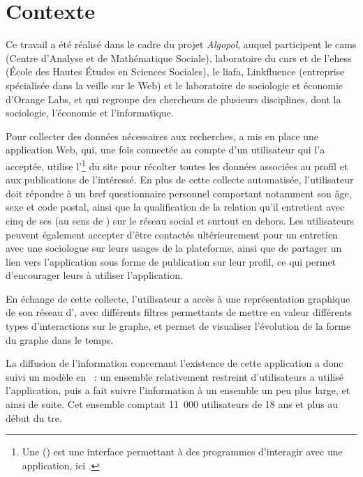 
\section{Contexte}

Ce travail a été réalisé dans le cadre du projet \emph{Algopol}, auquel
participent le {\sc cams} (Centre d’Analyse et de Mathématique Sociale),
laboratoire du {\sc cnrs} et de l'{\sc ehess} (École des Hautes Études en
Sciences Sociales), le {\sc liafa}, Linkfluence (entreprise spécialisée dans la
veille sur le Web) et le laboratoire de sociologie et économie d’Orange Labs,
et qui regroupe des chercheurs de plusieurs disciplines, dont la sociologie,
l’économie et l’informatique.

Pour collecter des données nécessaires aux recherches,  a mis en
place une application Web, qui, une fois connectée au compte \fb{} d’un
utilisateur qui l’a acceptée, utilise l’\api\footnote{Une \api{}
() est une interface permettant à des
programmes d’interagir avec une application, ici \fb{}.} du site pour
récolter toutes les données associées au profil et aux publications de
l’intéressé. En plus de cette collecte automatisée, l’utilisateur doit répondre
à un bref questionnaire personnel comportant notamment son âge, sexe et code
postal, ainsi que la qualification de la relation qu’il entretient avec cinq de
ses  (au sens de \fb{}) sur le réseau social et surtout en dehors.
Les utilisateurs peuvent également accepter d’être contactés ultérieurement
pour un entretien avec une sociologue sur leurs usages de la plateforme, ainsi
que de partager un lien vers l’application sous forme de publication sur leur
profil, ce qui permet d’encourager leurs  à utiliser l’application.

En échange de cette collecte, l’utilisateur a accès à une représentation
graphique de son réseau d’, avec différents filtres permettants de
mettre en valeur différents types d’interactions sur le graphe, et permet de
visualiser l’évolution de la forme du graphe dans le temps.

La diffusion de l’information concernant l’existence de cette application a
donc suivi un modèle en ~: un ensemble relativement restreint
d’utilisateurs a utilisé l’application, puis a fait suivre l’information à un
ensemble un peu plus large, et ainsi de suite. Cet ensemble comptait 11~000
utilisateurs de 18 ans et plus au début du {\sc tre}.

